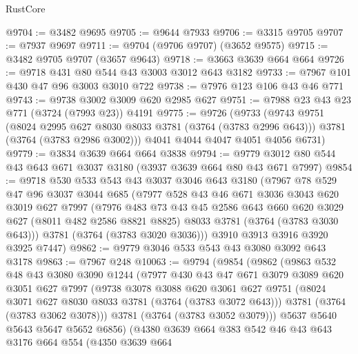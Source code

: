 \begin{lexlean}{RustCore}
\begin{coremodule}
@9704 := @3482 @9695
@9705 := @9644 @7933
@9706 := @3315 @9705
@9707 := @7937 @9697
@9711 := @9704 (@9706 @9707) (@3652 @9575)
@9715 := @3482 @9705 @9707 (@3657 @9643)
@9718 := @3663 @3639 @664 @664
@9726 := @9718 @431 @80 @544 @43 @3003 @3012 @643 @3182
@9733 := @7967 @101 @430 @47 @96 @3003 @3010 @722
@9738 := @7976 @123 @106 @43 @46 @771
@9743 := @9738 @3002 @3009 @620 @2985 @627
@9751 := @7988 @23 @43 @23 @771 (@3724 (@7993 @23)) @4191
@9775 := @9726
    (@9733
      (@9743
        @9751
        (@8024 @2995 @627 @8030 @8033 @3781 (@3764 (@3783 @2996 @643)))
        @3781
        (@3764 (@3783 @2986 @3002)))
      @4041
      @4044
      @4047
      @4051
      @4056
      @6731)
@9779 := @3834 @3639 @664 @664 @3838
@9794 := @9779 @3012 @80 @544 @43 @643 @671 @3037 @3180 (@3937 @3639 @664 @80 @43 @671 @7997)
@9854 := @9718
    @530
    @533
    @543
    @43
    @3037
    @3046
    @643
    @3180
    (@7967
      @78
      @529
      @47
      @96
      @3037
      @3044
      @685
      (@7977
        @528
        @43
        @46
        @671
        @3036
        @3043
        @620
        @3019
        @627
        @7997
        (@7976
          @483
          @73
          @43
          @45
          @2586
          @643
          @660
          @620
          @3029
          @627
          (@8011 @482 @2586 @8821 @8825)
          @8033
          @3781
          (@3764 (@3783 @3030 @643)))
        @3781
        (@3764 (@3783 @3020 @3036)))
      @3910
      @3913
      @3916
      @3920
      @3925
      @7447)
@9862 := @9779 @3046 @533 @543 @43 @3080 @3092 @643 @3178
@9863 := @7967 @248
@10063 := @9794
    (@9854
      (@9862
        (@9863
          @532
          @48
          @43
          @3080
          @3090
          @1244
          (@7977
            @430
            @43
            @47
            @671
            @3079
            @3089
            @620
            @3051
            @627
            @7997
            (@9738
              @3078
              @3088
              @620
              @3061
              @627
              @9751
              (@8024 @3071 @627 @8030 @8033 @3781 (@3764 (@3783 @3072 @643)))
              @3781
              (@3764 (@3783 @3062 @3078)))
            @3781
            (@3764 (@3783 @3052 @3079)))
          @5637
          @5640
          @5643
          @5647
          @5652
          @6856)
        (@4380
          @3639
          @664
          @383
          @542
          @46
          @43
          @643
          @3176
          @664
          @554
          (@4350
            @3639
            @664

\end{coremodule}
\end{lexlean}
